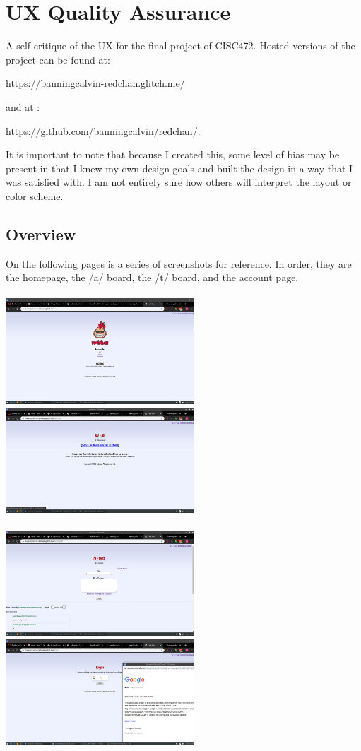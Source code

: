%
%
\chapter{UX Quality Assurance}
A self-critique of the UX for the final project of CISC472. Hosted versions of the project can be found at:

https://banningcalvin-redchan.glitch.me/

and at :

https://github.com/banningcalvin/redchan/.

It is important to note that because I created this, some level of bias may be present in that I knew my own design goals and built the design in a way that I was satisfied with. I am not entirely sure how others will interpret the layout or color scheme.
\section{Overview}


On the following pages is a series of screenshots for reference. In order, they are the homepage, the /a/ board, the /t/ board, and the account page.
\\\\
\includegraphics[width = 200pt]{images/home.png}
\includegraphics[width = 200pt]{images/aboard.png}
\\\\
\includegraphics[width = 200pt]{images/tboard.png}
\includegraphics[width = 200pt]{images/account.png}
\\\\

